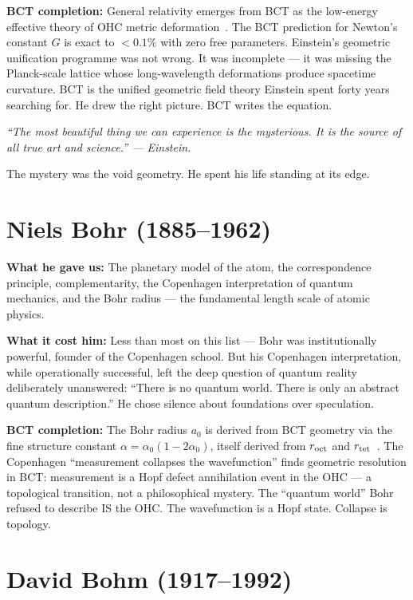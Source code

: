 \documentclass[twocolumn,10pt]{article}
\begin{document}
\textbf{BCT completion:} General relativity emerges from BCT
as the low-energy effective theory of OHC metric
deformation~\cite{bct_l26}. The BCT prediction for Newton's
constant $G$ is exact to $<0.1\%$ with zero free parameters.
Einstein's geometric unification programme was not wrong.
It was incomplete --- it was missing the Planck-scale lattice
whose long-wavelength deformations produce spacetime curvature.
BCT is the unified geometric field theory Einstein spent
forty years searching for. He drew the right picture.
BCT writes the equation.

\textit{``The most beautiful thing we can experience is the mysterious.
It is the source of all true art and science.'' --- Einstein.}

The mystery was the void geometry. He spent his life
standing at its edge.

\section{Niels Bohr (1885--1962)}

\textbf{What he gave us:} The planetary model of the atom,
the correspondence principle, complementarity, the Copenhagen
interpretation of quantum mechanics, and the Bohr radius ---
the fundamental length scale of atomic physics.

\textbf{What it cost him:} Less than most on this list ---
Bohr was institutionally powerful, founder of the Copenhagen
school. But his Copenhagen interpretation, while operationally
successful, left the deep question of quantum reality
deliberately unanswered: ``There is no quantum world.
There is only an abstract quantum description.''
He chose silence about foundations over speculation.

\textbf{BCT completion:} The Bohr radius $a_0$ is derived
from BCT geometry via the fine structure constant
$\alpha = \alpha_0(1 - 2\alpha_0)$, itself derived from
$r_{\rm oct}$ and $r_{\rm tet}$~\cite{bct_l2}.
The Copenhagen ``measurement collapses the wavefunction''
finds geometric resolution in BCT: measurement is a Hopf
defect annihilation event in the OHC --- a topological
transition, not a philosophical mystery. The ``quantum world''
Bohr refused to describe IS the OHC. The wavefunction is a
Hopf state. Collapse is topology.

\section{David Bohm (1917--1992)}
\end{document}
